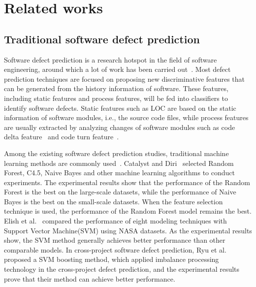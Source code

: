 \documentclass[journal]{IEEEtran}
\begin{document}
\section{Related works}
\subsection{Traditional software defect prediction}
Software defect prediction is a research hotspot in the field of software engineering, around which a lot of work has been carried out~\cite{wang2018deep,fan2019deep,menzies2006data}. 
Most defect prediction techniques are focused on proposing new discriminative features that can be generated from the history information of software. These features, including static features and process features, will be fed into classifiers to identify software defects. Static features such as LOC are based on the static information of software modules, i.e., the source code files, while process features are usually extracted by analyzing changes of software modules such as code delta feature~\cite{nagappan2010change} and code turn feature~\cite{nagappan2005use}.


Among the existing software defect prediction studies, traditional machine learning methods are commonly used~\cite{elish2008predicting,wen2012systematic}. Catalyst and Diri~\cite{catal2009investigating} selected Random Forest, C4.5, Naive Bayes and other machine learning algorithms to conduct experiments. The experimental results show that the performance of the Random Forest is the best on the large-scale datasets, while the performance of Naive Bayes is the best on the small-scale datasets. When the feature selection technique is used, the performance of the Random Forest model remains the best. Elish et al.~\cite{elish2008predicting} compared the performance of eight modeling techniques with Support Vector Machine(SVM) using NASA datasets. As the experimental results show, the SVM method generally achieves better performance than other comparable models. In cross-project software defect prediction, Ryu et al.~\cite{ryu2016value} proposed a SVM boosting method, which applied imbalance processing technology in the cross-project defect prediction, and the experimental results prove that their method can achieve better performance.
\end{document}

